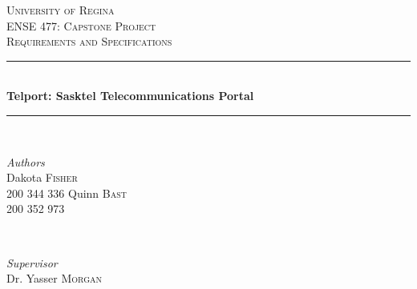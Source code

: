 \documentclass[12pt]{article}
\begin{document}

\begin{titlepage} %
	\newcommand{\HRule}{\rule{\linewidth}{0.5mm}} %
	
	\center %
	
	
	\textsc{\LARGE University of Regina}\\[1.5cm] %
	
	\textsc{\Large ENSE 477: Capstone Project}\\[0.5cm] %
	
	\textsc{\large Requirements and Specifications}\\[0.5cm] %
	
	
	\HRule\\[0.4cm]
	
	{\huge\bfseries Telport: Sasktel Telecommunications Portal}\\[0.4cm] %
	
	\HRule\\[1.5cm]
	
	
	\begin{minipage}[t]{0.4\textwidth}
		\begin{flushleft}
			\large
			\textit{Authors}\\
			Dakota \textsc{Fisher}\\ %
			200 344 336\newline \newline
			Quinn \textsc{Bast}\\ %
			200 352 973
		\end{flushleft}
	\end{minipage}
	~
	\begin{minipage}[t]{0.4\textwidth}
		\begin{flushright}
			\large
			\textit{Supervisor}\\
			Dr. Yasser \textsc{Morgan} %
		\end{flushright}
	\end{minipage}
	

\end{titlepage}
\end{document}
